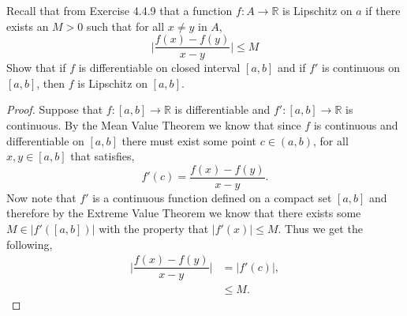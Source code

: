\documentclass[12pt]{article}
\makeatletter
\theoremstyle{homework}
\newenvironment{exercise}[1]
{\def\@currentlabel{#1}\exercisecore}
{\endexercisecore}
\newcommand{\Reals}{\ensuremath{\mathbb R}}
\makeatother
\begin{document}
\begin{exercise}{Abbott 5.3.1(a)} Recall that from Exercise 4.4.9 that a function $f: A \to \Reals$ is 
  Lipschitz on $a$ if there exists an $M > 0$ such that for all $x \neq y$ in $A$,
  \begin{equation*}
   \big| \dfrac{f(x) - f(y)}{x - y} \big| \le M
  \end{equation*} 
  Show that if $f$ is differentiable on closed interval $[a,b]$ and if $f'$ is continuous on $[a,b]$, then $f$ 
  is Lipschitz on $[a,b]$.\\
  
  \begin{proof}
    Suppose that $f: [a,b] \to \Reals$ is differentiable and $f':[a,b] \to \Reals $ is continuous. By the Mean Value Theorem 
    we know that since $f$ is continuous and differentiable on $[a,b]$ there must exist some point $c \in (a,b)$, for all $x,y \in [a,b]$ that satisfies,
    \begin{equation*}
      f'(c) = \dfrac{f(x) - f(y)}{x - y}.
    \end{equation*}
    Now note that $f'$ is a continuous function defined on a compact set $[a,b]$ and therefore by the Extreme Value Theorem we know that there exists some 
    $M \in |f'([a,b])|$ with the property that $|f'(x)| \le M$. Thus we get the following,
    \begin{align*}
      \big| \dfrac{f(x) - f(y)}{x - y} \big| &= |f'(c)|,\\
      &\le M.
    \end{align*} 
  \end{proof}
\end{exercise}
\vspace{.5in}
\end{document}
